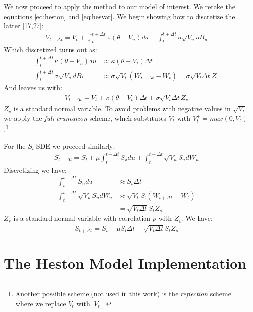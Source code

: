 \documentclass[12pt,twoside]{reedthesis}
\theoremstyle{definition}
\theoremstyle{definition}
\theoremstyle{remark}
\begin{document}
  We now proceed to apply the method to our model of interest. We retake
  the equations \eqref{eq:heston} and \eqref{eq:hesvar}. We begin showing how
  to discretize the latter {[}17,27{]}:
  \begin{align}
  \label{eq:hesvareuler}
  V_{t+\Delta t} = V_t+ \int_{t}^{t+\Delta t}{\kappa (\theta - V_u) du} + \int_{t}^{t+\Delta t}{\sigma \sqrt{V_u} dB_u}
  \end{align}
  Which discretized turns out as:
  \begin{align*}
   \int_{t}^{t+\Delta t}{\kappa (\theta - V_u)} du &\approx \kappa (\theta - V_t) \Delta t\\
   \int_{t}^{t+\Delta t}{\sigma \sqrt{V_u}} dB_t &\approx \sigma \sqrt{V_t} (W_{t+\Delta t}-W_t)
  = \sigma \sqrt{V_t \Delta t} Z_v
  \end{align*}
  And leaves us with:
  \begin{align}
  V_{t+\Delta t} = V_t + \kappa (\theta - V_t) \Delta t + \sigma \sqrt{V_t \Delta t} Z_v
  \end{align}
  \(Z_v\) is a standard normal variable. To avoid problems with negative
  values in \(\sqrt{V_t}\) we apply the \emph{full truncation} scheme,
  which substitutes \(V_t\) with \(V_t^+ = max(0, V_t)\).\footnote{Another
    possible scheme (not used in this work) is the \emph{reflection}
    scheme where we replace \(V_t\) with \(\mid V_t \mid\)}
  
  For the \(S_t\) SDE we proceed similarly:
  \begin{align}
  \label{eq:heseuler}
  S_{t+\Delta t} = S_t+ \mu \int_{t}^{t+\Delta t}{ S_u du} + \int_{t}^{t+\Delta t}{\sqrt{V_u} S_u dW_u}
  \end{align}
  Discretizing we have:
  \begin{align*}
   \int_{t}^{t+\Delta t}{S_u} du &\approx S_t \Delta t\\
   \int_{t}^{t+\Delta t}{\sqrt{V_u} S_u} dW_u &\approx \sqrt{V_t} S_t (W_{t+\Delta t}-W_t)\\
  &= \sqrt{V_t \Delta t} S_t Z_s
  \end{align*}
  \(Z_s\) is a standard normal variable with correlation \(\rho\) with
  \(Z_v\). We have:
  \begin{align}
  S_{t+\Delta t} = S_t + \mu S_t \Delta t + \sqrt{V_t \Delta t} S_t Z_s
  \end{align}
  \chapter{The Heston Model Implementation}\label{implement}
  
\end{document}
